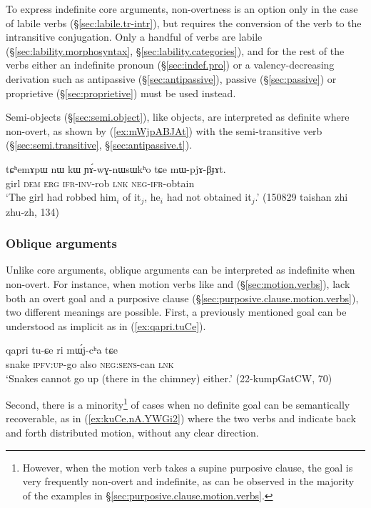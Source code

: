 To express indefinite core arguments, non-overtness is an option only in the case of labile verbs (§\ref{sec:labile.tr-intr}), but requires the conversion of the verb to the intransitive conjugation. Only a handful of verbs are labile (§\ref{sec:lability.morphosyntax}, §\ref{sec:lability.categories}), and for the rest of the verbs either an indefinite pronoun (§\ref{sec:indef.pro}) or a valency-decreasing derivation such as antipassive (§\ref{sec:antipassive}), passive (§\ref{sec:passive}) or proprietive (§\ref{sec:proprietive}) must be used instead.

Semi-objects (§\ref{sec:semi.object}), like objects, are interpreted as definite where non-overt, as shown by (\ref{ex:mWjpABJAt}) with the semi-transitive verb  (§\ref{sec:semi.transitive}, §\ref{sec:antipassive.t}).

\begin{exe}
\ex \label{ex:mWjpABJAt}
\gll tɕʰemɤpɯ nɯ kɯ ɲɤ́-wɣ-nɯsɯkʰo tɕe mɯ-pjɤ-βɟɤt. \\
girl \textsc{dem} \textsc{erg} \textsc{ifr}-\textsc{inv}-rob \textsc{lnk} \textsc{neg}-\textsc{ifr}-obtain \\
\glt `The girl had robbed him$_i$ of it$_j$, he$_i$ had not obtained it$_j$.' (150829 taishan zhi zhu-zh, 134)
\end{exe}

\subsubsection{Oblique arguments}
Unlike core arguments, oblique arguments can be interpreted as indefinite when non-overt. For instance, when motion verbs like  and  (§\ref{sec:motion.verbs}), lack both an overt goal and a purposive clause (§\ref{sec:purposive.clause.motion.verbs}), two different meanings are possible. First, a previously mentioned goal can be understood as implicit as in (\ref{ex:qapri.tuCe}).

\begin{exe} 
\ex \label{ex:qapri.tuCe}
\gll qapri tu-ɕe ri mɯ́j-cʰa tɕe \\
snake \textsc{ipfv}:\textsc{up}-go also \textsc{neg}:\textsc{sens}-can \textsc{lnk} \\
\glt `Snakes cannot go up (there in the chimney) either.' (22-kumpGatCW, 70)
\end{exe} 

Second, there is a minority\footnote{However, when the motion verb takes a supine purposive clause, the goal is very frequently non-overt and indefinite, as can be observed in the majority of the examples in §\ref{sec:purposive.clause.motion.verbs}.  } of cases when no definite goal can be semantically recoverable, as in (\ref{ex:kuCe.nA.YWGi2}) where the two verbs  and  indicate back and forth distributed motion, without any clear direction.


